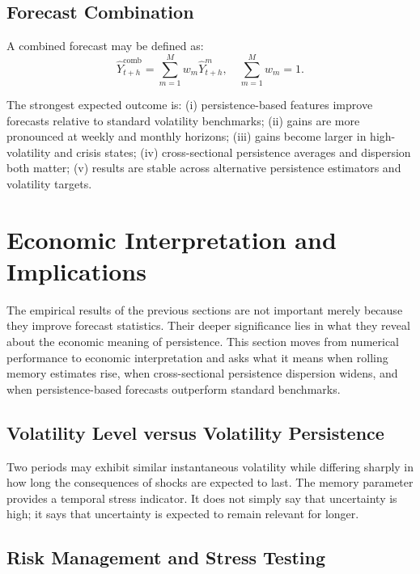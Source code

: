 \documentclass[12pt]{article}
\begin{document}
\subsection{Forecast Combination}

A combined forecast may be defined as:
\[
\hat{Y}_{t+h}^{\mathrm{comb}} = \sum_{m=1}^{M} w_m \hat{Y}_{t+h}^m, \quad \sum_{m=1}^{M} w_m = 1.
\]

The strongest expected outcome is: (i) persistence-based features improve forecasts relative to standard volatility benchmarks; (ii) gains are more pronounced at weekly and monthly horizons; (iii) gains become larger in high-volatility and crisis states; (iv) cross-sectional persistence averages and dispersion both matter; (v) results are stable across alternative persistence estimators and volatility targets.

\section{Economic Interpretation and Implications}
\label{sec:econ}

The empirical results of the previous sections are not important merely because they improve forecast statistics. Their deeper significance lies in what they reveal about the economic meaning of persistence. This section moves from numerical performance to economic interpretation and asks what it means when rolling memory estimates rise, when cross-sectional persistence dispersion widens, and when persistence-based forecasts outperform standard benchmarks.

\subsection{Volatility Level versus Volatility Persistence}

Two periods may exhibit similar instantaneous volatility while differing sharply in how long the consequences of shocks are expected to last. The memory parameter provides a temporal stress indicator. It does not simply say that uncertainty is high; it says that uncertainty is expected to remain relevant for longer.

\subsection{Risk Management and Stress Testing}
\end{document}
